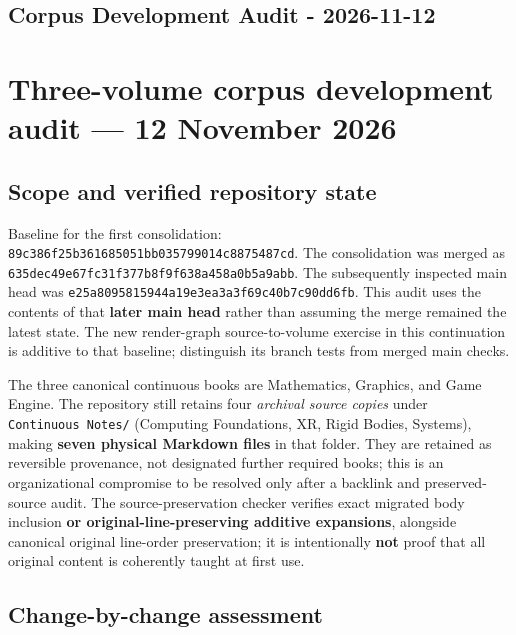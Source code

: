 \hypertarget{appendix-28e6f216fdc7}{}
\section*{Corpus Development Audit - 2026-11-12}
\chapter{Three-volume corpus development audit --- 12 November 2026}\label{appendix-28e6f216fdc7-three-volume-corpus-development-audit-12-november-2026}

\section{Scope and verified repository state}\label{appendix-28e6f216fdc7-scope-and-verified-repository-state}

Baseline for the first consolidation: \texttt{89c386f25b361685051bb035799014c8875487cd}. The consolidation was merged as \texttt{635dec49e67fc31f377b8f9f638a458a0b5a9abb}. The subsequently inspected main head was \texttt{e25a8095815944a19e3ea3a3f69c40b7c90dd6fb}. This audit uses the contents of that \textbf{later main head} rather than assuming the merge remained the latest state. The new render-graph source-to-volume exercise in this continuation is additive to that baseline; distinguish its branch tests from merged main checks.

The three canonical continuous books are Mathematics, Graphics, and Game Engine. The repository still retains four \emph{archival source copies} under \texttt{Continuous\ Notes/} (Computing Foundations, XR, Rigid Bodies, Systems), making \textbf{seven physical Markdown files} in that folder. They are retained as reversible provenance, not designated further required books; this is an organizational compromise to be resolved only after a backlink and preserved-source audit. The source-preservation checker verifies exact migrated body inclusion \textbf{or original-line-preserving additive expansions}, alongside canonical original line-order preservation; it is intentionally \textbf{not} proof that all original content is coherently taught at first use.

\section{Change-by-change assessment}\label{appendix-28e6f216fdc7-change-by-change-assessment}

